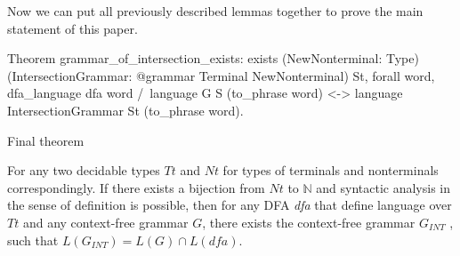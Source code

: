 Now we can put all previously described lemmas together to prove the main statement of this paper.

\begin{listing}[h]
   \begin{pyglist}[language=coq, numbers=none, numbersep=5pt]

Theorem grammar_of_intersection_exists:
 exists
  (NewNonterminal: Type)
  (IntersectionGrammar:
     @grammar Terminal NewNonterminal) St,
 forall word,
   dfa_language dfa word /\
	    language G S (to_phrase word) <->
   language IntersectionGrammar St
	         (to_phrase word).
  \end{pyglist}
\caption{Final theorem}
\label{lst:lang-eq}
\end{listing}

\begin{theorem}
    For any two decidable types $Tt$ and $Nt$ for types of terminals and nonterminals correspondingly.
    If there exists a bijection from $Nt$ to $\mathbb{N}$ and syntactic analysis in the sense of definition is possible, then for any DFA \textit{dfa} that define language over $Tt$ and any context-free grammar $G$, there exists the context-free grammar $G_{INT}$ , such that $L(G_{INT}) = L(G) \cap L(\textit{dfa})$.
\end{theorem}

